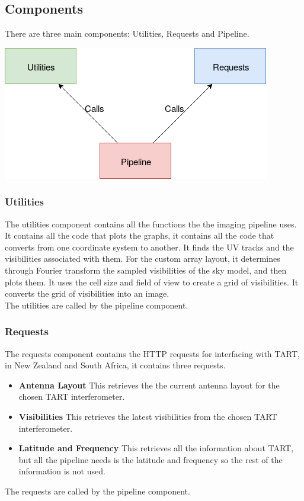 \subsection{Components}
There are three main components: Utilities, Requests and Pipeline.
\begin{center}
    \includegraphics[scale=0.6]{images/BLOCKDIAGRAM.png}
\end{center}{}
\subsubsection{Utilities}
The utilities component contains all the functions the the imaging pipeline uses.\\
It contains all the code that plots the graphs, it contains all the code that converts from one coordinate system to another. It finds the UV tracks and the visibilities associated with them. For the custom array layout, it determines through Fourier transform the sampled visibilities of the sky model, and then plots them. It uses the cell size and field of view to create a grid of visibilities. It converts the grid of visibilities into an image.\\
The utilities are called by the pipeline component.

\subsubsection{Requests}
The requests component contains the HTTP requests for interfacing with TART, in New Zealand and South Africa, it contains three requests.
\begin{itemize}
    \item \textbf{Antenna Layout} This retrieves the the current antenna layout for the chosen TART interferometer.
    \item \textbf{Visibilities} This retrieves the latest visibilities from the chosen TART interferometer.
    \item \textbf{Latitude and Frequency} This retrieves all the information about TART, but all the pipeline needs is the latitude and frequency so the rest of the information is not used.
\end{itemize}
The requests are called by the pipeline component.

